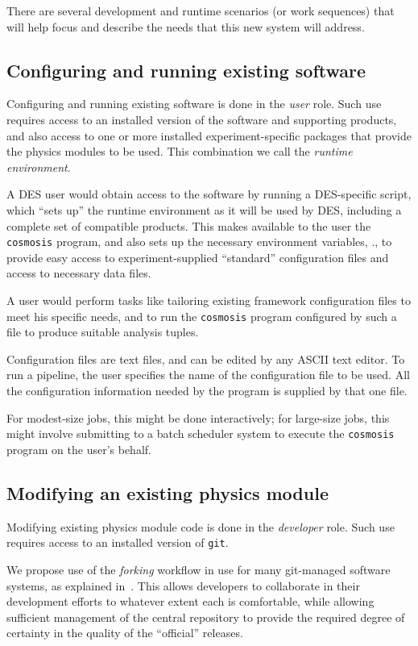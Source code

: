 \documentclass[draftmode,draftwater]{memarticle}
\newcommand{\prog}[1]%
  {\texttt{#1}}
\newcommand{\cosmosis}{\name{CosmoSIS}\xspace}
\begin{document}
There are several development and runtime scenarios (or work sequences)
that will help focus and describe the needs that this new system will
address.

\subsection{Configuring and running existing software}

Configuring and running existing software is done in the \emph{user}
role. Such use requires access to an installed version of the \cosmosis
software and supporting products, and also access to one or more
installed experiment-specific packages that provide the physics modules
to be used. This combination we call the \emph{runtime environment}.

A DES user would obtain access to the software by running a
DES-specific script, which ``sets up'' the runtime environment as
it will be used by DES, including a complete set of compatible products.
This makes available to the user the \prog{cosmosis} program, and also
sets up the necessary environment variables, \etc., to provide easy
access to experiment-supplied ``standard'' configuration files and
access to necessary data files.

A user would perform tasks like tailoring existing framework
configuration files to meet his specific needs, and to run the
\prog{cosmosis} program configured by such a file to produce suitable analysis
tuples.

Configuration files are text files, and can be edited by any ASCII text
editor. To run a pipeline, the user specifies the name of the
configuration file to be used. All the configuration information needed
by the program is supplied by that one file.

 For modest-size jobs, this might be done
interactively; for large-size jobs, this might involve submitting to
a batch scheduler system to execute the \prog{cosmosis} program on the user's behalf.

\subsection{Modifying an existing physics module\label{sec:modify-an-exist}}

Modifying existing physics module code is done in the
\emph{developer} role. Such use requires access to an
installed version of \prog{git}.

We propose use of the \emph{forking} workflow in use for many
git-managed software systems, as explained
in~\cite{forking-git-workflow}. This allows developers to collaborate in
their development efforts to whatever extent each is comfortable, while
allowing sufficient management of the central repository to provide the
required degree of certainty in the quality of the ``official'' releases.
\end{document}
